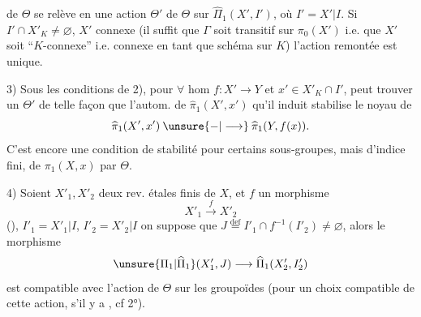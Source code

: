 
de $\Theta$ se relève en une action $\Theta'$ de $\Theta$ sur $\widehat{\Pi}_1(X',I')$, où $I'=X'\vert I$.
Si  $I'\cap X'_K\ne\varnothing$, $X'$  connexe (il suffit que $\Gamma$ soit transitif sur $\pi_0(X')$ i.e. que $X'$ soit ``$K$-connexe'' i.e. connexe en tant que schéma sur $K$)  l'action remontée est unique.


3) Sous les conditions de 2), pour $\forall$ hom $f:X'\longrightarrow Y$ et  $x'\in X'_K\cap I'$,   peut trouver un $\Theta'$  de telle façon que l'autom. de $\widehat{\pi}_1(X',x')$ qu'il induit  stabilise le noyau de
\[
\widehat{\pi}_1(X',x')\mathbin{\unsure{-|\longrightarrow}}\widehat{\pi}_1(Y,f(x)).
\]
C'est encore une condition de stabilité pour certains sous-groupes, mais  d'indice fini, de $\pi_1(X,x)$ par $\Theta$.


4) Soient $X'_1,X'_2$ deux rev. étales finis de $X$, et $f$ un morphisme
\[
X'_1\xrightarrow{f}X'_2
\]
(), $I'_1=X'_1\vert I$, $I'_2=X'_2\vert I$ on suppose  que $J\overset{\mathrm{def}}=I'_1\cap f^{-1}(I'_2)\ne\varnothing$,   alors  le morphisme
\[
\unsure{\Pi_1|\widehat{\Pi}_1}(X'_1,J)\longrightarrow\widehat{\Pi}_1(X'_2,I'_2)
\]
est compatible avec l'action  de $\Theta$ sur les groupoïdes (pour un choix compatible de cette action, s'il y a , cf 2°).
